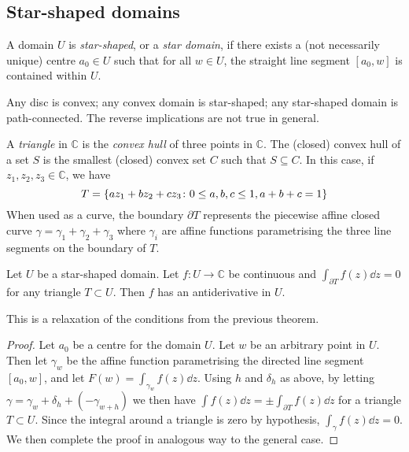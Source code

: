 \subsection{Star-shaped domains}
\begin{definition}
	A domain \( U \) is \textit{star-shaped}, or a \textit{star domain}, if there exists a (not necessarily unique) centre \( a_0 \in U \) such that for all \( w \in U \), the straight line segment \( [a_0, w] \) is contained within \( U \).
\end{definition}
\begin{remark}
	Any disc is convex; any convex domain is star-shaped; any star-shaped domain is path-connected.
	The reverse implications are not true in general.
\end{remark}
\begin{definition}
	A \textit{triangle} in \( \mathbb C \) is the \textit{convex hull} of three points in \( \mathbb C \).
	The (closed) convex hull of a set \( S \) is the smallest (closed) convex set \( C \) such that \( S \subseteq C \).
	In this case, if \( z_1, z_2, z_3 \in \mathbb C \), we have
	\[
		T = \qty{az_1 + bz_2 + cz_3 \colon 0 \leq a,b,c \leq 1, a+b+c=1}
	\]
	When used as a curve, the boundary \( \partial T \) represents the piecewise affine closed curve \( \gamma = \gamma_1 + \gamma_2 + \gamma_3 \) where \( \gamma_i \) are affine functions parametrising the three line segments on the boundary of \( T \).
\end{definition}
\begin{corollary}
	Let \( U \) be a star-shaped domain.
	Let \( f \colon U \to \mathbb C \) be continuous and \( \int_{\partial T} f(z) \dd{z} = 0 \) for any triangle \( T \subset U \).
	Then \( f \) has an antiderivative in \( U \).
\end{corollary}
\begin{remark}
	This is a relaxation of the conditions from the previous theorem.
\end{remark}
\begin{proof}
	Let \( a_0 \) be a centre for the domain \( U \).
	Let \( w \) be an arbitrary point in \( U \).
	Then let \( \gamma_w \) be the affine function parametrising the directed line segment \( [a_0,w] \), and let \( F(w) = \int_{\gamma_w} f(z) \dd{z} \).
	Using \( h \) and \( \delta_h \) as above, by letting \( \gamma = \gamma_w + \delta_h + (-\gamma_{w+h}) \) we then have \( \int f(z) \dd{z} = \pm \int_{\partial T} f(z) \dd{z} \) for a triangle \( T \subset U \).
	Since the integral around a triangle is zero by hypothesis, \( \int_\gamma f(z) \dd{z} = 0 \).
	We then complete the proof in analogous way to the general case.
\end{proof}
